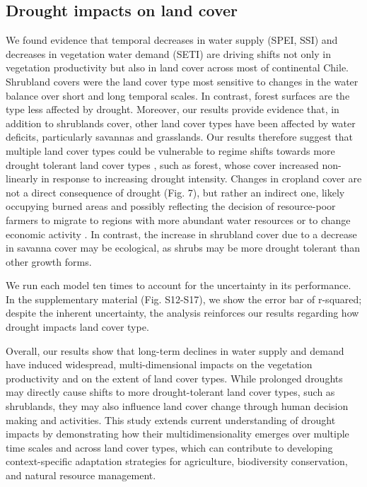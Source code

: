\documentclass[
  sn-nature,
  numbered]{sn-jnl}
\begin{document}
\subsection{Drought impacts on land
cover}\label{drought-impacts-on-land-cover}

We found evidence that temporal decreases in water supply (SPEI, SSI)
and decreases in vegetation water demand (SETI) are driving shifts not
only in vegetation productivity but also in land cover across most of
continental Chile. Shrubland covers were the land cover type most
sensitive to changes in the water balance over short and long temporal
scales. In contrast, forest surfaces are the type less affected by
drought. Moreover, our results provide evidence that, in addition to
shrublands cover, other land cover types have been affected by water
deficits, particularly savannas and grasslands. Our results therefore
suggest that multiple land cover types could be vulnerable to regime
shifts towards more drought tolerant land cover types
\citep{Scheffer2001, Martinez-Vilalta2016}, such as forest, whose cover
increased non-linearly in response to increasing drought intensity.
Changes in cropland cover are not a direct consequence of drought (Fig.
7), but rather an indirect one, likely occupying burned areas and
possibly reflecting the decision of resource-poor farmers to migrate to
regions with more abundant water resources or to change economic
activity \citep{AghaKouchak2021, Hermans2021}. In contrast, the increase
in shrubland cover due to a decrease in savanna cover may be ecological,
as shrubs may be more drought tolerant than other growth
forms\citep{Eldridge2011, Gotmark2016}.

We run each model ten times to account for the uncertainty in its
performance. In the supplementary material (Fig. S12-S17), we show the
error bar of r-squared; despite the inherent uncertainty, the analysis
reinforces our results regarding how drought impacts land cover type.

Overall, our results show that long-term declines in water supply and
demand have induced widespread, multi-dimensional impacts on the
vegetation productivity and on the extent of land cover types. While
prolonged droughts may directly cause shifts to more drought-tolerant
land cover types, such as shrublands, they may also influence land cover
change through human decision making and activities. This study extends
current understanding of drought impacts by demonstrating how their
multidimensionality emerges over multiple time scales and across land
cover types, which can contribute to developing context-specific
adaptation strategies for agriculture, biodiversity conservation, and
natural resource management.
\end{document}
